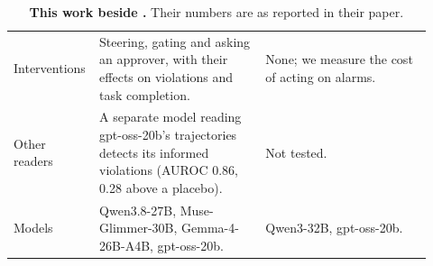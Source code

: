 \begin{table}[h]
\begin{tabular}{@{}>{\raggedright\arraybackslash}p{0.14\linewidth}>{\raggedright\arraybackslash}p{0.39\linewidth}>{\raggedright\arraybackslash}p{0.39\linewidth}@{}}
    Interventions & Steering, gating and asking an approver, with their effects on violations and task completion. & None; we measure the cost of acting on alarms. \\
    Other readers & A separate model reading gpt-oss-20b's trajectories detects its informed violations (AUROC 0.86, 0.28 above a placebo). & Not tested. \\
    Models & Qwen3.8-27B, Muse-Glimmer-30B, Gemma-4-26B-A4B, gpt-oss-20b. & Qwen3-32B, gpt-oss-20b. \\
    \bottomrule
  \end{tabular}
  \caption{\textbf{This work beside \citet{fayyazi2026agent}.} Their numbers are as reported in their paper.}
  \label{tab:tgk}
\end{table}
